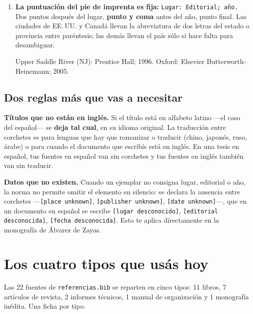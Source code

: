 \documentclass[11pt,a4paper]{article}
\begin{document}
\begin{enumerate}
\item \textbf{La puntuación del pie de imprenta es fija:} \texttt{Lugar: Editorial; año.}
  Dos puntos después del lugar, \textbf{punto y coma} antes del año, punto final. Las
  ciudades de EE.\,UU. y Canadá llevan la abreviatura de dos letras del estado o provincia
  entre paréntesis; las demás llevan el país sólo si hace falta para desambiguar.
  \par\vspace{3pt}\hspace{1.5em}\begin{minipage}{0.9\textwidth}\small
  Upper Saddle River (NJ): Prentice Hall; 1996. \quad\textbullet\quad
  Oxford: Elsevier Butterworth-Heinemann; 2005.
  \end{minipage}
\end{enumerate}

\subsection*{Dos reglas más que vas a necesitar}

\textbf{Títulos que no están en inglés.} Si el título está en alfabeto latino ---el caso del
español--- se \textbf{deja tal cual}, en su idioma original. La traducción entre corchetes es
para lenguas que hay que romanizar o traducir (chino, japonés, ruso, árabe) o para cuando el
documento que escribís está en inglés. En una tesis en español, tus fuentes en español van sin
corchetes y tus fuentes en inglés también van sin traducir.

\textbf{Datos que no existen.} Cuando un ejemplar no consigna lugar, editorial o año, la norma
no permite omitir el elemento en silencio: se declara la ausencia entre corchetes
---\texttt{[place unknown]}, \texttt{[publisher unknown]}, \texttt{[date unknown]}---, que en
un documento en español se escribe \texttt{[lugar desconocido]}, \texttt{[editorial
desconocida]}, \texttt{[fecha desconocida]}. Esto te aplica directamente en la monografía de
Álvarez de Zayas.

\section{Los cuatro tipos que usás hoy}

Las 22 fuentes de \texttt{referencias.bib} se reparten en cinco tipos: 11 libros, 7 artículos
de revista, 2 informes técnicos, 1 manual de organización y 1 monografía inédita. Una ficha
por tipo.
\end{document}
